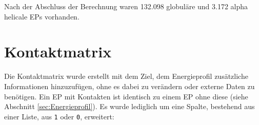 Nach der Abschluss der Berechnung waren 132.098 globuläre und 3.172 alpha helicale \ac{EP}s vorhanden.

\section{Kontaktmatrix}
\label{sec:Kontaktmatrix}
Die Kontaktmatrix wurde erstellt mit dem Ziel, dem Energieprofil zusätzliche Informationen hinzuzufügen, ohne es dabei zu verändern oder externe Daten zu benötigen. Ein \ac{EP} mit Kontakten ist identisch zu einem \ac{EP} ohne diese (siehe Abschnitt \ref{sec:Energieprofil}). Es wurde lediglich um eine Spalte, bestehend aus einer Liste, aus \texttt{1} oder \texttt{0}, erweitert:

\begin{table}[H]
    \centering
    \caption{Dargestellt ist das gleiche \ac{EP} wie in Tabelle \ref{tab:EP}, mit zusätzlichem Kontaktprofil in jeder \texttt{ENGY} Zeile. Hierbei steht eine 1 für einen Kontakt und eine 0 für keinen Kontakt innerhalb der 8 Angström Sprähre, vergleiche \ref{fig:8A_Sphaere}.}
    \label{tab:kontaktmatrix}
\end{table}
